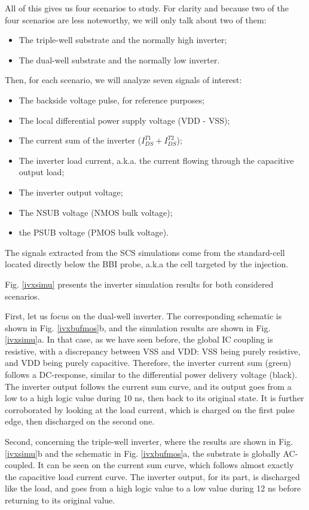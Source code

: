 	All of this gives us four scenarios	 to study.
	For clarity and because two of the four scenarios are less noteworthy, we will only talk about two of them:
	\begin{itemize}
		\item The triple-well substrate and the normally high inverter;
		\item The dual-well substrate and the normally low inverter.
	\end{itemize}
	Then, for each scenario, we will analyze seven signals of interest:
	\begin{itemize}
		\item The backside voltage pulse, for reference purposes;
		\item The local differential power supply voltage (VDD - VSS);
		\item The current sum of the inverter ($I_{DS}^{T1} + I_{DS}^{T2}$);
		\item The inverter load current, a.k.a. the current flowing through the capacitive output load;
		\item The inverter output voltage;
		\item The NSUB voltage (NMOS bulk voltage);
		\item the PSUB voltage (PMOS bulk voltage).
	\end{itemize}
	The signals extracted from the SCS simulations come from the standard-cell located directly below the BBI probe, a.k.a the cell targeted by the injection.
	
	Fig. \ref{ivxsimu} presents the inverter simulation results for both considered scenarios.

	First, let us focus on the dual-well inverter.
	The corresponding schematic is shown in Fig. \ref{ivxbufmos}b, and the simulation results are shown in Fig. \ref{ivxsimu}a.
	In that case, as we have seen before, the global IC coupling is resistive, with a discrepancy between VSS and VDD: VSS being purely resistive, and VDD being purely capacitive.
	Therefore, the inverter current sum (green) follows a DC-response, similar to the differential power delivery voltage (black).
	The inverter output follows the current sum curve, and its output goes from a low to a high logic value during 10 ns, then back to its original state.
	It is further corroborated by looking at the load current, which is charged on the first pulse edge, then discharged on the second one.

	Second, concerning the triple-well inverter, where the results are shown in Fig. \ref{ivxsimu}b and the schematic in Fig. \ref{ivxbufmos}a, the substrate is globally AC-coupled.
	It can be seen on the current sum curve, which follows almost exactly the capacitive load current curve.
	The inverter output, for its part, is discharged like the load, and goes from a high logic value to a low value during 12 ns before returning to its original value.

